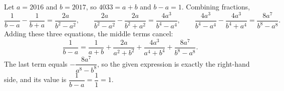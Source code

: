 Let $a=2016$ and $b=2017$, so $4033=a+b$ and $b-a=1$. Combining fractions,
\[
\dfrac{1}{b-a}-\dfrac{1}{b+a}=\dfrac{2a}{b^2-a^2},\qquad
\dfrac{2a}{b^2-a^2}-\dfrac{2a}{b^2+a^2}=\dfrac{4a^3}{b^4-a^4},\qquad
\dfrac{4a^3}{b^4-a^4}-\dfrac{4a^3}{b^4+a^4}=\dfrac{8a^7}{b^8-a^8}.
\]
Adding these three equations, the middle terms cancel:
\[
\dfrac{1}{b-a}=\dfrac{1}{a+b}+\dfrac{2a}{a^2+b^2}+\dfrac{4a^3}{a^4+b^4}+\dfrac{8a^7}{b^8-a^8}.
\]
The last term equals $-\dfrac{8a^7}{a^8-b^8}$, so the given expression is exactly the right-hand side, and its value is $\dfrac{1}{b-a}=\dfrac{1}{1}=\boxed{1}$.
